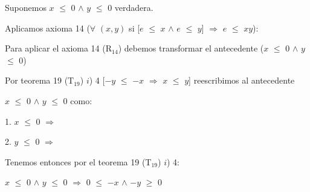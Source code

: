 \documentclass[12pt]{article}
\begin{document}
{\textcolor{palatinateblue}{Suponemos}} {\Large{$x$ $\leq$ $0$ $\wedge$ $y$ $\leq$ $0$ }} {\textcolor{pakistangreen}{verdadera.}} \vspace{0.5cm}

{\textcolor{carrotorange}{Aplicamos axioma 14}} \textcolor{pakistangreen}{($\forall$ $(x,y)$ si [$e$ $\leq$ $x$ $\wedge$ $e$ $\leq$ $y$] $\Rightarrow$ $e$ $\leq$ $xy$):} {\vspace{0.5cm}}

{\textcolor{palatinateblue}{Para aplicar el}}  {\textcolor{carrotorange}{axioma 14 (R$_{14}$)}} {\textcolor{palatinateblue}{ debemos transformar el antecedente}} {\textcolor{pakistangreen}{($x$ $\leq$ $0$ $\wedge$ $y$ $\leq$ $0$)}} \vspace{0.5cm}

{\textcolor{carrotorange}{Por teorema 19 (T$_{19}$) $i$) 4}} {\textcolor{pakistangreen}{[$-y$ $\leq$ $-x$ $\Longrightarrow$ $x$ $\leq$ $y$]}} {\textcolor{palatinateblue}{reescribimos al antecedente}} \vspace{0.1cm}
 
{\textcolor{pakistangreen}{$x$ $\leq$ $0$ $\wedge$ $y$ $\leq$ $0$}} {\textcolor{palatinateblue}{como}}: \vspace{0.5cm}

1. \hspace{2.1cm} $x$ $\leq$ $0$ $\Longrightarrow$ {{\textcolor{darkviolet}{}}}\vspace{0.5cm}

2. \hspace{2.1cm} $y$ $\leq$ $0$ $\Longrightarrow$ {{\textcolor{darkviolet}{}}}\vspace{0.5cm}

{\textcolor{palatinateblue}{Tenemos entonces por el }} {\textcolor{carrotorange}{teorema 19 (T$_{19}$) $i$) 4}}: \vspace{0.5cm}

\hspace{1.4cm} $x$ $\leq$ $0$ \hspace{0.1cm} $\wedge$ \hspace{0.1cm} $y$ $\leq$ $0$ \hspace{0.1cm} $\Longrightarrow$ \hspace{0.1cm} $0$ $\leq$ $-x$ \hspace{0.1cm} $\wedge$ \hspace{0.1cm} $-y$ $\geq$ $0$ \vspace{0.5cm}
\end{document}
